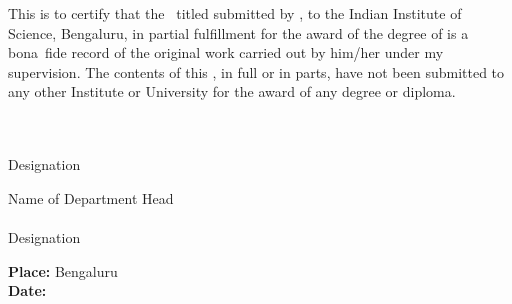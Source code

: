 This is to certify that the \Doctype\ titled \textbf{\textit{\Title}}
submitted by {\bf\Author}, to the Indian Institute of Science, Bengaluru, in partial fulfillment for the award of the
degree of {\bf\Degreetext} is a bona~fide record of the original work carried
out by him/her under my supervision. The contents of this \Doctype, in full or
in parts, have not been submitted to any other Institute or University for
the award of any degree or diploma.

\vspace{35mm}
\noindent
\begin{minipage}{0.5\textwidth}
\Advisor\\ \\
Designation
\end{minipage}
\hspace{2cm}
\begin{minipage}{0.5\textwidth}
Name of Department Head\\ \\
Designation
\end{minipage}

\vspace{30mm}
\noindent
\textbf{Place: }Bengaluru\\
\textbf{Date: \ }\Date


